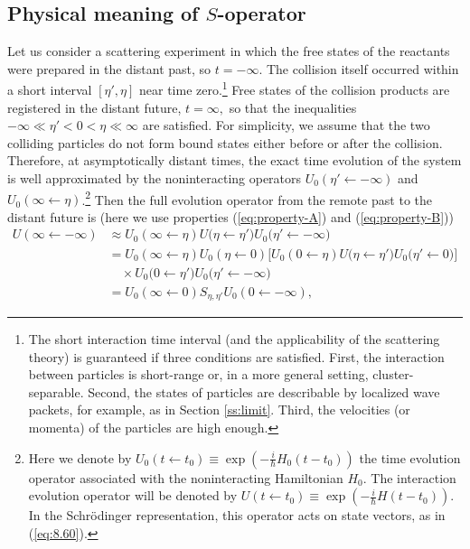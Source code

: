 \documentclass[]{stefan1}
\begin{document}
\subsection{Physical meaning of $S$-operator}\label{sc:scatter}
Let us consider a scattering experiment in which the free states of the
reactants were prepared in the distant past, so $ t = - \infty $. The
collision itself occurred within a short interval $  [ \eta ',
\eta  ]  $ near time zero.\footnote{The short interaction time
interval (and the applicability of the scattering theory) is guaranteed
if three conditions are satisfied. First, the interaction between
particles is short-range or, in a more general setting,
cluster-separable. Second, the states of particles are describable by
localized wave packets, for example, as in Section \ref{ss:limit}.
Third, the velocities (or momenta) of the particles are high enough.}
Free states of the collision products are registered in the distant
future, $ t = \infty , $ so that the inequalities $ - \infty \ll
\eta '<0 <\eta \ll \infty $ are satisfied. For simplicity, we assume
that the two colliding particles do not form bound states either before
or after the collision. Therefore, at asymptotically distant times, the
exact time evolution of the system is well approximated by the
noninteracting operators $ U_{0}  ( \eta '\gets - \infty  )  $
and $ U_{0} (\infty \gets \eta ) $.\footnote{Here we denote by
$ U_{0} (t \gets t_{0}) \equiv \exp   ( - \frac{i}{\hbar } H_{0} (t-t
_{0})  )  $ the time evolution operator associated with the
noninteracting Hamiltonian $ H_{0} $. The interaction evolution operator
will be denoted by $ U (t \gets t_{0}) \equiv \exp   ( - \frac{i}{
\hbar } H (t-t_{0})  )  $. In the Schr\"{o}dinger representation,
this operator acts on state vectors, as in (\ref{eq:8.60}).} Then the
full evolution operator from the remote past to the distant future is
(here we use properties (\ref{eq:property-A}) and (\ref{eq:property-B}))
%
\begin{align}
U(\infty \gets -\infty ) &\approx U_{0}(\infty \gets \eta )
U \bigl( \eta \gets \eta ' \bigr) U_{0} \bigl( \eta
' \gets -\infty \bigr)
\nonumber
\\
&= U_{0}(\infty \gets \eta ) U_{0}(\eta \gets 0) \bigl[
U_{0}(0 \gets \eta ) U \bigl( \eta \gets \eta ' \bigr)
U_{0} \bigl( \eta ' \gets 0 \bigr) \bigr]
\nonumber
\\
&\quad  \times U_{0} \bigl( 0 \gets \eta ' \bigr) U_{0}
\bigl( \eta ' \gets -\infty \bigr)
\nonumber
\\
& = U_{0}(\infty \gets 0)
S_{\eta , \eta '} U_{0}(0 \gets - \infty ), \label{eq:8.63}
\end{align}
\end{document}
